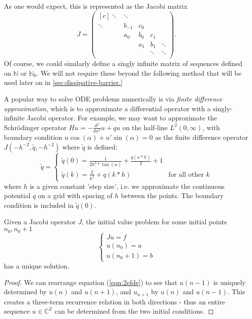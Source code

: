 \documentclass[../main.tex]{subfiles}
\begin{document}
As one would expect, this is represented as the Jacobi matrix
  $$ 
  J = 
  \begin{pmatrix*}[c]
    \ddots & \ddots & & & \\
    \ddots & b_{-1} & c_0 & & \\
    & a_0 & b_0 & c_1 & \\
    & & a_1 & b_1 & \ddots \\
    & & & \ddots & \ddots \\
  \end{pmatrix*}.
  $$
Of course, we could similarly define a singly infinite matrix of sequences defined on $\mathbb{N}$
or $\mathbb{N}_0$. We will not require these beyond the following method that will be used
later on in \ref{sec:dissipative-barrier.}

\begin{example}
\label{ex:finite-differences}
  A popular way to solve ODE problems numerically is via \emph{finite difference approximation},
  which is to approximate a differential operator with a singly-infinite Jacobi operator. For
  example, we may want to approximate the Schr\"odinger operator $Hu = -\frac{d^2}{dx^2}u + qu$
  on the half-line $L^2(0, \infty)$, with boundary condition $u \cos(\alpha) + u' \sin(\alpha) = 0$
  as the finite difference operator
  $J(-h^{-2}, \tilde{q}, -h^{-2})$
  where $\tilde{q}$ is defined:
  $$
  \tilde{q} =
  \begin{cases}
    \tilde{q}(0) = \frac{1}{2h^2 * \tan(\alpha)} + \frac{q(x*h)}{2} + 1 \\
    \tilde{q}(k) = \frac{2}{h^2} + q(k*h) & \text{for all other $k$}
  \end{cases}
  $$
  where $h$ is a given constant 'step size', i.e. we approximate the continuous
  potential $q$ on a grid with spacing of $h$ between the points. The boundary
  condition is included in $\tilde{q}(0)$.
\end{example}

\begin{proposition}\label{thm:2efde-sols} 
  Given a Jacobi operator $J$, the initial value problem for some initial points
  $n_0, n_0 + 1$
  $$
  \begin{cases}
    Ju = f\\
    u(n_0) = a\\ u(n_0 + 1) = b
  \end{cases} 
  $$
  has a unique solution.
\end{proposition}
\begin{proof}
We can rearrange equation (\ref{eqn:2efde}) to see that $u(n-1)$ is uniquely
determined by $u(n)$ and $u(n+1)$, and $u_{n+1}$ by $u(n)$ and
$u(n-1)$. This creates a three-term recurrence relation in both directions -
thus an entire sequence $u \in \mathbb{C}^\mathbb{Z}$ can be determined from the two
initial conditions.
\end{proof}
\end{document}

